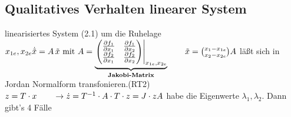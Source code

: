 \documentclass[11pt,a4paper]{article}
\begin{document}
\subsection{Qualitatives Verhalten linearer System}
linearisiertes System (2.1) um die Ruhelage $x_{1e}, x_{2e}\\
\dot{\tilde x} = A\, \tilde x \text{ mit } 
A= \underbrace{\left.\begin{pmatrix}
\frac{\partial f_1}{\partial x_1} & \frac{\partial f_1}{\partial x_2} \\
\frac{\partial f_2}{\partial x_1} & \frac{\partial f_2}{\partial x_2} 
\end{pmatrix}\right|_{x_{1e}, x_{2e}}}_{\text{\textbf{Jakobi-Matrix}}} \qquad \tilde x = \binom{x_1 - x_{1e}}{x_2 - x_{2e}}\\
A$ läßt sich in Jordan Normalform transfonieren.(RT2)\\
$z= T\cdot x \qquad \rightarrow \dot z = T^{-1} \cdot A \cdot T \cdot z = J\cdot z \\A$ habe die Eigenwerte $\lambda_1, \lambda_2$. Dann gibt's 4 Fälle
\end{document}
